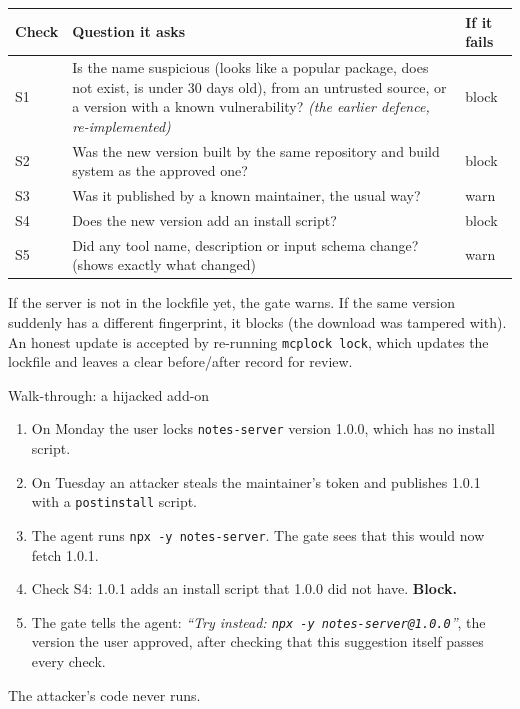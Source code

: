 \documentclass[11pt,a4paper]{article}
\newcommand{\code}[1]{\texttt{#1}}
\begin{document}
\begin{center}
\begin{tabularx}{\textwidth}{@{}l>{\raggedright\arraybackslash}X>{\raggedright\arraybackslash}p{2.6cm}@{}}
\toprule
\textbf{Check} & \textbf{Question it asks} & \textbf{If it fails} \\
\midrule
S1 & Is the name suspicious (looks like a popular package, does not exist, is under 30 days old), from an untrusted
source, or a version with a known vulnerability? \emph{(the earlier defence, re-implemented)} & block \\
S2 & Was the new version built by the same repository and build system as the approved one? & block \\
S3 & Was it published by a known maintainer, the usual way? & warn \\
S4 & Does the new version add an install script? & block \\
S5 & Did any tool name, description or input schema change? (shows exactly what changed) & warn \\
\bottomrule
\end{tabularx}
\end{center}

If the server is not in the lockfile yet, the gate warns. If the same version suddenly has a different fingerprint,
it blocks (the download was tampered with). An honest update is accepted by re-running \code{mcplock lock}, which
updates the lockfile and leaves a clear before/after record for review.

\begin{example}{Walk-through: a hijacked add-on}
\begin{enumerate}[leftmargin=*]
  \item On Monday the user locks \code{notes-server} version 1.0.0, which has no install script.
  \item On Tuesday an attacker steals the maintainer's token and publishes 1.0.1 with a \code{postinstall} script.
  \item The agent runs \code{npx -y notes-server}. The gate sees that this would now fetch 1.0.1.
  \item Check S4: 1.0.1 adds an install script that 1.0.0 did not have. \textbf{Block.}
  \item The gate tells the agent: \emph{``Try instead: \code{npx -y notes-server@1.0.0}''}, the version the user
        approved, after checking that this suggestion itself passes every check.
\end{enumerate}
The attacker's code never runs.
\end{example}
\end{document}
